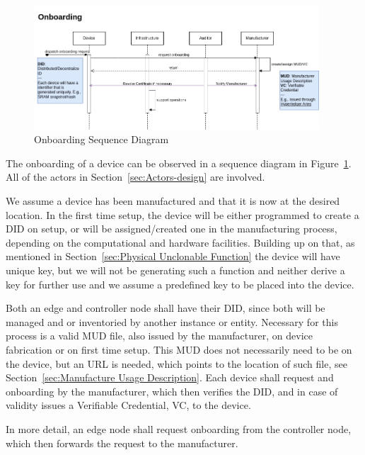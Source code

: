 \label{sec:Onboarding}
\begin{figure}
	\begin{center}
		\includegraphics[width=0.95\textwidth]{figures/onboarding-sequence-diagram.png}
	\end{center}
	\caption{Onboarding Sequence Diagram}
	\label{fig:onboarding-sequence-diagram}
\end{figure}

The onboarding of a device can be observed in a sequence diagram in Figure~\ref{fig:onboarding-sequence-diagram}.
All of the actors in Section~\ref{sec:Actors-design} are involved.

We assume a device has been manufactured and that it is now at the desired location. In the first time setup, the device
will be either programmed to create a DID on setup, or will be assigned/created one in the manufacturing process,
depending on the computational and hardware facilities. Building up on that, as mentioned in
Section~\ref{sec:Physical Unclonable Function} the device will have unique key, but we will not be generating such a
function and neither derive a key for further use and we assume a predefined key to be placed into the device.

Both an edge and controller node shall have their DID, since
both will be managed and or inventoried by another instance or entity.
Necessary for this process is a valid MUD file, also issued by the manufacturer, on device fabrication or on first time
setup. This MUD does not necessarily need to be on the device, but an URL is needed, which points to the location of
such file, see Section~\ref{sec:Manufacture Usage Description}.
Each device shall request and onboarding by the manufacturer, which then verifies the DID, and in case of validity
issues a Verifiable Credential, VC, to the device.

In more detail, an edge node shall request onboarding from the controller node, which then forwards the request to the
manufacturer.

